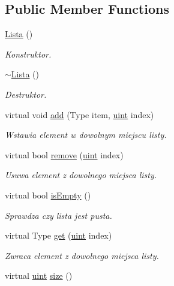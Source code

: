 \subsection*{Public Member Functions}
\begin{DoxyCompactItemize}
\item 
\hyperlink{class_lista_a9e74820e2d81e143c273992e563dffd3}{Lista} ()
\begin{DoxyCompactList}\small\item\em Konstruktor. \end{DoxyCompactList}\item 
\hyperlink{class_lista_a8de4b73bf5501c3fea7dd4041c320008}{$\sim$\-Lista} ()
\begin{DoxyCompactList}\small\item\em Destruktor. \end{DoxyCompactList}\item 
virtual void \hyperlink{class_lista_a5016da5359009ca7e3421de513cb3999}{add} (Type item, \hyperlink{_i_lista_8h_a91ad9478d81a7aaf2593e8d9c3d06a14}{uint} index)
\begin{DoxyCompactList}\small\item\em Wstawia element w dowolnym miejscu listy. \end{DoxyCompactList}\item 
virtual bool \hyperlink{class_lista_a0513f36b0f98c1793a015e955b7274cb}{remove} (\hyperlink{_i_lista_8h_a91ad9478d81a7aaf2593e8d9c3d06a14}{uint} index)
\begin{DoxyCompactList}\small\item\em Usuwa element z dowolnego miejsca listy. \end{DoxyCompactList}\item 
virtual bool \hyperlink{class_lista_acbc1b67a23e04ed8a6fd1ca378872c7d}{is\-Empty} ()
\begin{DoxyCompactList}\small\item\em Sprawdza czy lista jest pusta. \end{DoxyCompactList}\item 
virtual Type \hyperlink{class_lista_aee227de057432c07d4045506b350ee14}{get} (\hyperlink{_i_lista_8h_a91ad9478d81a7aaf2593e8d9c3d06a14}{uint} index)
\begin{DoxyCompactList}\small\item\em Zwraca element z dowolnego miejsca listy. \end{DoxyCompactList}\item 
virtual \hyperlink{_i_lista_8h_a91ad9478d81a7aaf2593e8d9c3d06a14}{uint} \hyperlink{class_lista_aff0cca3c261459240d16dfc64d397e5d}{size} ()

\end{DoxyCompactItemize}
